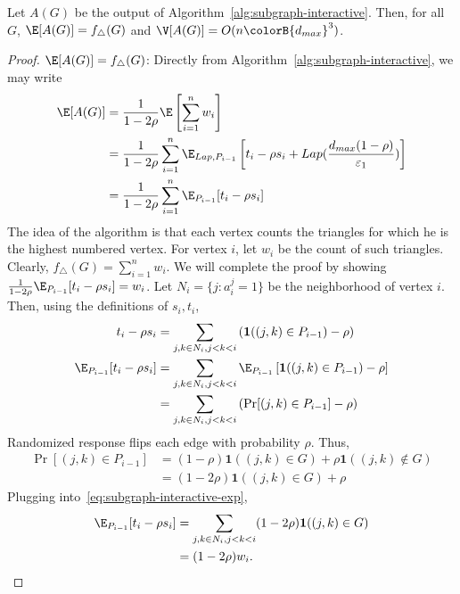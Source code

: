 
\begin{lemma}\label{lem:subgraph-interactive-perf}
  Let $A(G)$ be the output of Algorithm~\ref{alg:subgraph-interactive}. 
  Then, for all $G$, $\E[A(G)] =
  f_\triangle(G)$ and $\V[A(G)] = O(n\colorB{d_{max}}^3)$.
\end{lemma}
\begin{proof}
  \noindent 
  \textbf{$\E[A(G)] = f_\triangle(G)$}:
  Directly from Algorithm~\ref{alg:subgraph-interactive}, we may write
  \begin{align*}
    \E[A(G)] &= \frac{1}{1-2\rho}\E\left[\sum_{i=1}^n w_i\right] \\
    &= \frac{1}{1-2\rho}\sum_{i=1}^n
    \E_{Lap, P_{i-1}}\left[t_i - \rho s_i +
    Lap(\frac{d_{max}(1-\rho)}{\varepsilon_1})\right] \\
    &= \frac{1}{1-2\rho}\sum_{i=1}^n
    \E_{P_{i-1}} [t_i - \rho s_i]
  \end{align*}
  The idea of the algorithm is that each vertex counts the triangles for which
  he is the highest numbered vertex. For vertex $i$, let $w_i$ be the count of
  such triangles. Clearly, $f_\triangle(G) = \sum_{i=1}^n w_i$. We will complete the proof
  by showing $\frac{1}{1-2\rho}\E_{P_{i-1}} [t_i - \rho s_i] = w_i$. 
  Let $N_i = \{j : a_i^j = 1\}$ 
  be the neighborhood of vertex $i$. Then, using the definitions of $s_i, t_i$,
  \begin{align}
    t_i - \rho s_i &= \sum_{j,k \in N_i, j<k<i}\left(\textbf{1}((j,k) \in
    P_{i-1}) - \rho\right) \label{eq:subgraph-interactive-tri} \\
    \E_{P_{i-1}}[t_i - \rho s_i] &= \sum_{j,k \in N_i, j<k<i} \E_{P_{i-1}}\left[\textbf{1}( (j,k)
    \in P_{i-1}) - \rho\right] \nonumber \\
    &= \sum_{j,k \in N_i, j<k<i} \left( \Pr[(j,k) \in P_{i-1}] - \rho
    \right)\label{eq:subgraph-interactive-exp}
  \end{align}
  Randomized response flips each edge with probability $\rho$. Thus,
  \begin{align*}
    \Pr[(j,k) \in P_{i-1}]
    &= (1-\rho) \textbf{1}( (j,k) \in G ) + \rho
    \textbf{1}( (j,k) \notin G) \\
    &= (1-2\rho) \textbf{1}( (j,k) \in G) + \rho
  \end{align*}
  Plugging into~\eqref{eq:subgraph-interactive-exp}, 
  \begin{align*}
    \E_{P_{i-1}}[t_i - \rho s_i] &= \sum_{j,k \in N_i, j<k<i} (1-2\rho)
    \textbf{1}( (j,k) \in G) \\ &= (1-2\rho) w_i.
  \end{align*}


\end{proof}
